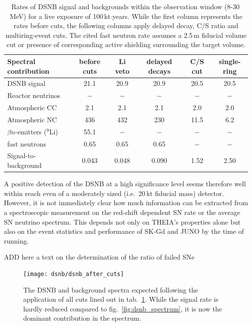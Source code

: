 \begin{table}[htp]
\begin{center}
\begin{tabular}{lccccc}
\hline
Spectral contribution			& before cuts & Li veto & delayed decays & C/S cut & single-ring \\
\hline
DSNB signal				& 21.1	& 20.9	& 20.9	& 20.5	& 20.5\\
Reactor neutrinos			& $-$	& $-$ 	& $-$	& $-$	& $-$ \\
Atmospheric CC			& 2.1		& 2.1		& 2.1		& 2.0		& 2.0 \\
\hline
Atmospheric NC			& 436	& 432 	& 230	&11.5	& 6.2 \\
$\beta n$-emitters ($^9$Li)	& 55.1 	& $-$	& $-$	& $-$	& $-$ \\
fast neutrons				& 0.65 	& 0.65  	& 0.65	& $-$	& $-$ \\
\hline
Signal-to-background		& 0.043	& 0.048	& 0.090	& 1.52 	& 2.50  \\
\hline
\end{tabular}
\end{center}
\caption{Rates of DSNB signal and backgrounds within the observation window (8-30\,MeV) for a live exposure of 100\,kt$\cdot$years. While the first column represents the rates before cuts, the following columns apply delayed decay, C/S ratio and multiring-event cuts. The cited fast neutron rate assumes a 2.5\,m fiducial volume cut or presence of corresponding active shielding surrounding the target volume.}
\label{tab:dsnb_rates}
\end{table}

\noindent A positive detection of the DSNB at a high significance level seems therefore well within reach even of a moderately sized (i.e.~20\,kt fiducial mass) detector. However, it is not immediately clear how much information can be extracted from a spectroscopic measurement on the red-shift dependent SN rate or the average SN neutrino spectrum. This depends not only on THEIA's properties alone but also on the event statistics and performance of SK-Gd and JUNO by the time of running.

ADD here a text on the determination of the ratio of failed SNe

\begin{figure}[htp!]
\centering
\texttt{[image: dsnb/dsnb\_after\_cuts]}
\caption{The DSNB and background spectra expected following the application of all cuts lined out in tab.~\ref{tab:dsnb_rates}. While the signal rate is hardly reduced compared to fig.~\ref{fig:dsnb_spectrum}, it is now the dominant contribution in the spectrum.}
\label{fig:dsnb_spectrum_after_cuts}
\end{figure}

